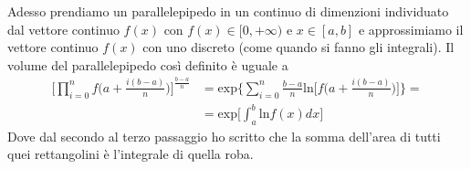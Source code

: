 \documentclass[11pt,a4paper]{report}
\theoremstyle{definition}
\theoremstyle{plain}
\theoremstyle{plain}
\begin{document}
			Adesso prendiamo un parallelepipedo in un continuo di dimenzioni individuato dal vettore continuo $f(x)$ con $f(x)\in[0,+\infty)$ e $x\in[a,b]$ e approssimiamo il vettore continuo $f(x)$ con uno discreto (come quando si fanno gli integrali).\newline
			Il volume del parallelepipedo così definito è uguale a
			\begin{equation}
			\label{eq:volterra}
			\begin{split}
				\Bigg[\prod_{i=0}^n f\bigg(a+\frac{i(b-a)}{n}\bigg)\Bigg]^{\frac{b-a}{n}}&=
				\textrm{exp}\Bigg\{\sum_{i=0}^n\frac{b-a}{n}\textrm{ln}\bigg[f\bigg(a+\frac{i(b-a)}{n}\bigg)\bigg]\Bigg\}=\\
				&=\textrm{exp}\bigg[\int_a^b \textrm{ln}f(x)dx\bigg]
			\end{split}
			\end{equation}
			Dove dal secondo al terzo passaggio ho scritto che la somma dell'area di tutti quei rettangolini è l'integrale di quella roba.\newline
\end{document}
